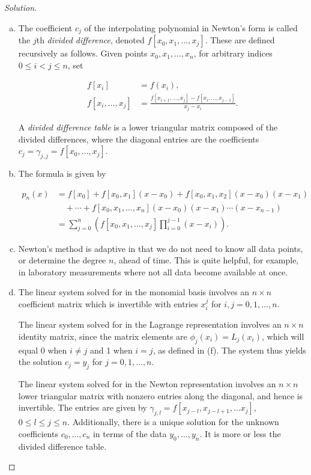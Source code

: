 \documentclass[12pt,a4]{article}
\theoremstyle{definition}
\begin{document}
\begin{proof}[Solution]
\begin{enumerate}[(a)]
		\item The coefficient $c_j$ of the interpolating polynomial in Newton's form is called the $j$th \emph{divided difference}, denoted $f[x_0, x_1, \ldots, x_j]$. These are defined recursively as follows. Given points $x_0, x_1, \ldots, x_n$, for arbitrary indices $0 \leq i < j \leq n$, set 
		
		\begin{align*}
		f[x_i] &= f(x_i) {,} \\
		f[x_i, \ldots, x_j] &= \frac{f[x_{i + 1}, \ldots, x_j] - f[x_i, \ldots, x_{j - 1}]}{x_j - x_i} {.}
		\end{align*}
		
		A \emph{divided difference table} is a lower triangular matrix composed of the divided differences, where the diagonal entries are the coefficients $c_j = \gamma_{j, j} = f[x_0, \ldots, x_j]$. 
		
		\item The formula is given by 
		
		\begin{align*}
		p_n(x) &= f[x_0] + f[x_0, x_1] (x - x_0) + f[x_0, x_1, x_2] (x - x_0) (x - x_1) \\
		 &\quad + \cdots + f[x_0, x_1, \ldots, x_n] (x - x_0) (x - x_1) \cdots (x - x_{n - 1}) \\
		 &= \sum_{j = 0}^{n} \left( f[x_0, x_1, \ldots, x_j] \prod_{i = 0}^{j - 1} (x - x_i) \right) {.} 
		\end{align*}
		
		\item Newton's method is adaptive in that we do not need to know all data points, or determine the degree $n$, ahead of time. This is quite helpful, for example, in laboratory measurements where not all data become available at once. 
		
		\item The linear system solved for in the monomial basis involves an $n \times n$ coefficient matrix which is invertible with entries $x_i^j$ for $i, j = 0, 1, \ldots, n$. 
		
		The linear system solved for in the Lagrange representation involves an $n \times n$ identity matrix, since the matrix elements are $\phi_j(x_i) =  L_j(x_i)$, which will equal 0 when $i \neq j$ and 1 when $i = j$, as defined in (f). The system thus yields the solution $c_j = y_j$ for $j = 0, 1, \ldots, n$. 
		
		The linear system solved for in the Newton representation involves an $n \times n$ lower triangular matrix with nonzero entries along the diagonal, and hence is invertible. The entries are given by $\gamma_{j, l} = f[x_{j - l}, x_{j - l + 1}, \ldots x_j]$, $0 \leq l \leq j \leq n$. Additionally, there is a unique solution for the unknown coefficients $c_0, \ldots, c_n$ in terms of the data $y_0, \ldots, y_n$. It is more or less the divided difference table. 
		

\end{enumerate}
\end{proof}
\end{document}
